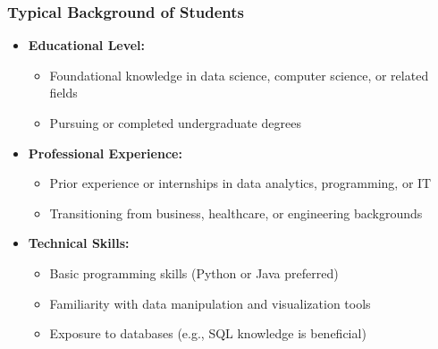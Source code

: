 \documentclass[aspectratio=169]{beamer}
\begin{document}
\begin{frame}[fragile]
    \frametitle{Typical Background of Students}
    \begin{itemize}
        \item \textbf{Educational Level:}
            \begin{itemize}
                \item Foundational knowledge in data science, computer science, or related fields
                \item Pursuing or completed undergraduate degrees
            \end{itemize}
        \item \textbf{Professional Experience:}
            \begin{itemize}
                \item Prior experience or internships in data analytics, programming, or IT
                \item Transitioning from business, healthcare, or engineering backgrounds
            \end{itemize}
        \item \textbf{Technical Skills:}
            \begin{itemize}
                \item Basic programming skills (Python or Java preferred)
                \item Familiarity with data manipulation and visualization tools
                \item Exposure to databases (e.g., SQL knowledge is beneficial)
            \end{itemize}
    \end{itemize}
\end{frame}
\end{document}
